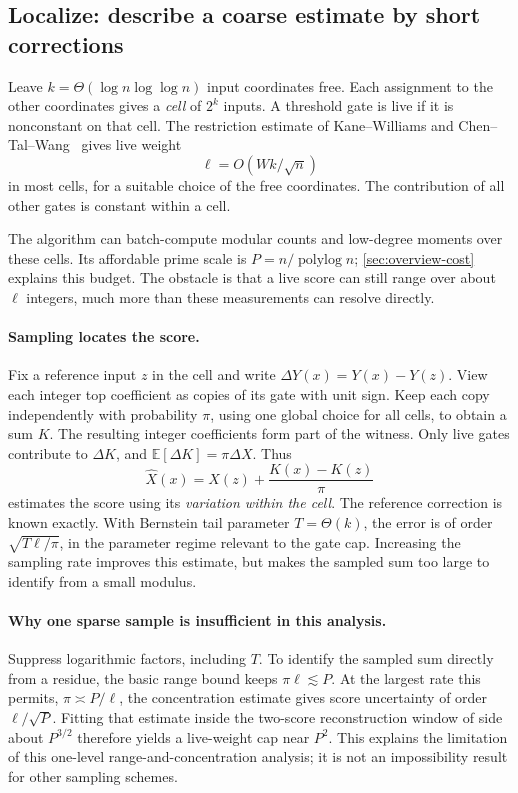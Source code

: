 \documentclass[11pt,letterpaper]{article}
\theoremstyle{definition}
\theoremstyle{remark}
\newcommand{\E}{\mathbb E}
\begin{document}
\subsection{Localize: describe a coarse estimate by short corrections}

Leave \(k=\Theta(\log n\log\log n)\) input coordinates free.
Each assignment to the other coordinates gives a \emph{cell} of
\(2^k\) inputs. A threshold gate is live if it is nonconstant on
that cell. The restriction estimate of Kane--Williams and
Chen--Tal--Wang~\cite{KW16,CTW26} gives live weight
\[
 \ell=O(Wk/\sqrt n)
\]
in most cells, for a suitable choice of the free coordinates.
The contribution of all other gates is constant within a cell.

The algorithm can batch-compute modular counts and low-degree moments
over these cells. Its affordable prime scale is
\(P=n/\operatorname{polylog}n\); \cref{sec:overview-cost}
explains this budget. The obstacle is that a live score can still
range over about \(\ell\) integers, much more than these measurements
can resolve directly.

\paragraph{Sampling locates the score.}
Fix a reference input \(z\) in the cell and write
\(\Delta Y(x)=Y(x)-Y(z)\). View each integer top coefficient as
copies of its gate with unit sign. Keep each copy independently with
probability \(\pi\), using one global choice for all cells, to obtain
a sum \(K\). The resulting integer coefficients form part of the
witness. Only live gates contribute to \(\Delta K\), and
\(\E[\Delta K]=\pi\Delta X\). Thus
\[
 \widehat X(x)=X(z)+\frac{K(x)-K(z)}{\pi}
\]
estimates the score using its \emph{variation within the cell}.
The reference correction is known exactly. With Bernstein tail
parameter \(T=\Theta(k)\), the error is of order
\(\sqrt{T\ell/\pi}\), in the parameter regime relevant to the gate cap.
Increasing the sampling rate improves this estimate, but makes the
sampled sum too large to identify from a small modulus.

\paragraph{Why one sparse sample is insufficient in this analysis.}
Suppress logarithmic factors, including \(T\). To identify the
sampled sum directly from a residue, the basic range bound keeps
\(\pi\ell\lesssim P\). At the largest rate this permits,
\(\pi\asymp P/\ell\), the concentration estimate gives score
uncertainty of order \(\ell/\sqrt P\). Fitting that estimate inside
the two-score reconstruction window of side about \(P^{3/2}\)
therefore yields a live-weight cap near \(P^2\). This explains the
limitation of this one-level range-and-concentration analysis;
it is not an impossibility result for other sampling schemes.
\end{document}
